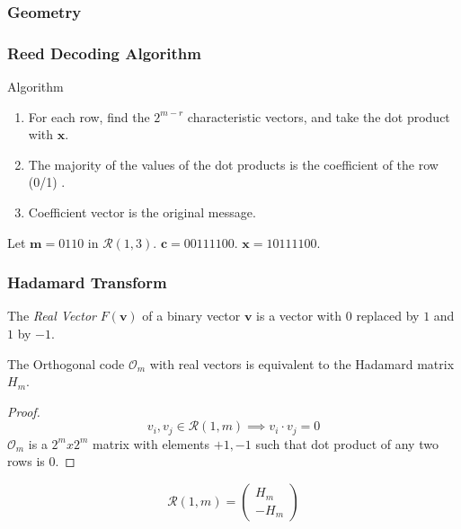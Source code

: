 \message{ !name(1.tex)}\documentclass[xcolor=xvgnames]{beamer}
\newcommand{\RM}[2]{\ensuremath{\mathcal{R}(#1,#2)}}
\newcommand{\V}[1]{\ensuremath{\mathbf{#1}}}
\begin{document}
\begin{frame}
  \frametitle{Geometry}
  
\end{frame}


\begin{frame}
  \frametitle{Reed Decoding Algorithm}
  \begin{block}{Algorithm}
    \begin{enumerate}
    \item For each row, find the $2^{m-r}$ \alert{characteristic vectors}, and take the dot product with $\V{x}$.
    \item The majority of the values of the dot products is the coefficient of the row (0/1) .
      \item Coefficient vector is the original message.
    \end{enumerate}
  \end{block}

  \begin{example}
Let $\V{m} = 0110$ in $\RM{1}{3}$. $\V{c} = 00111100$. $\V{x} = 10111100$.
  \end{example}
\end{frame}


\begin{frame}
  \frametitle{Hadamard Transform}
\begin{def}
  The \emph{Real Vector} ${F(\V{v})}$ of a binary vector $\V{v}$ is a vector with $0$ replaced by $1$ and $1$ by $-1$.
\end{def}

  \begin{lem}
  The Orthogonal code $\mathcal{O}_m$ with real vectors is equivalent to the Hadamard matrix $H_m$.
\begin{proof}
    \begin{equation*}
      v_i, v_j \in \RM{1}{m} \implies v_i\cdot v_j = 0
    \end{equation*}
$\mathcal{O}_m$ is a $2^m x 2^m$ matrix with elements $+1, -1$ such that dot product of any two rows is $0$.
\end{proof}
\end{lem}

\begin{equation}
  \label{eq:3}
  \RM{1}{m} =
  \begin{pmatrix}
    H_m \\
    -H_m
  \end{pmatrix}
\end{equation}

\end{frame}
\end{document}
